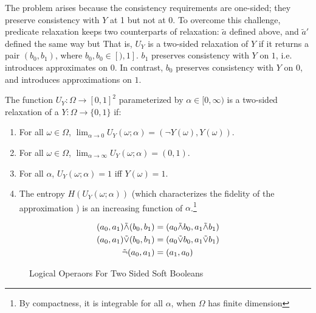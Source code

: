 The problem arises because the consistency requirements are one-sided; they preserve consistency with $Y$ at 1 but not at 0.
To overcome this challenge, predicate relaxation keeps two counterparts of relaxation: $\tilde{a}$ defined above, and $\tilde{a}'$ defined the same way but That is, $U_Y$ is a two-sided relaxation of $Y$ if it returns a pair $(b_0, b_1)$, where $b_0, b_0 \in [), 1]$.
$b_1$ preserves consistency with $Y$ on $1$, i.e. introduces approximates on $0$.
In contrast, $b_0$ preserves consistency with $Y$ on $0$, and introduces approximations on $1$.

\begin{definition}
The function $U_Y : \Omega \to [0, 1]^2$ parameterized by $\alpha \in [0, \infty)$ is a two-sided relaxation of a $Y: \Omega \to \{0, 1\}$ if:
\begin{enumerate}[label=(\roman*)]
	\label{def:temp}
	\item For all $\omega \in \Omega$, $\lim_{\alpha \to 0}U_Y(\omega; \alpha) = (\neg Y(\omega), Y(\omega))$.
	\item For all $\omega \in \Omega$, $\lim_{\alpha \to \infty}U_Y(\omega; \alpha) = (0, 1)$.

    \item For all $\alpha$, $U_Y(\omega; \alpha) = 1$ iff $Y(\omega) = 1$.
    \item The entropy $H(U_Y(\omega; \alpha))$ (which characterizes the fidelity of the approximation ) is an increasing function of $\alpha$.\footnote
    {By compactness, it is integrable for all $\alpha$, when $\Omega$ has finite dimension}
\end{enumerate}
\end{definition}


\begin{figure}
\begin{align*}
(a_0, a_1) \tilde{\land} (b_0, b_1) &= (a_0 \tilde{\land} b_0, a_1 \tilde{\land} b_1)\\
(a_0, a_1) \tilde{\lor} (b_0, b_1) &= (a_0 \tilde{\lor} b_0, a_1 \tilde{\lor} b_1)\\
\tilde{\neg}(a_0, a_1) &= (a_1, a_0)
\end{align*}
\caption{Logical Operaors For Two Sided Soft Booleans}
\end{figure}




